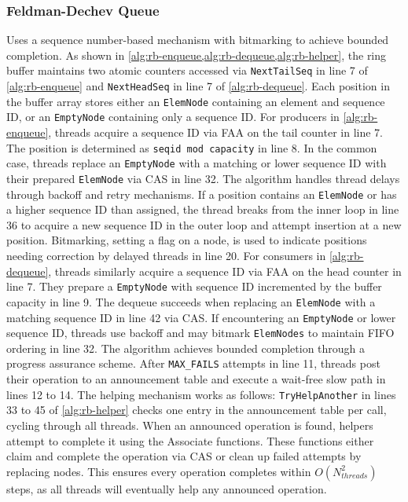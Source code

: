 \subsubsection{Feldman-Dechev Queue} 
Uses a sequence number-based mechanism with bitmarking to achieve bounded completion. As shown in \cref{alg:rb-enqueue,alg:rb-dequeue,alg:rb-helper}, the ring buffer maintains two atomic counters accessed via \texttt{NextTailSeq} in line 7 of \cref{alg:rb-enqueue} and \texttt{NextHeadSeq} in line 7 of \cref{alg:rb-dequeue}. Each position in the buffer array stores either an \texttt{ElemNode} containing an element and sequence ID, or an \texttt{EmptyNode} containing only a sequence ID. For producers in \cref{alg:rb-enqueue}, threads acquire a sequence ID via \ac{FAA} on the tail counter in line 7. The position is determined as \texttt{seqid mod capacity} in line 8. In the common case, threads replace an \texttt{EmptyNode} with a matching or lower sequence ID with their prepared \texttt{ElemNode} via \ac{CAS} in line 32. The algorithm handles thread delays through backoff and retry mechanisms. If a position contains an \texttt{ElemNode} or has a higher sequence ID than assigned, the thread breaks from the inner loop in line 36 to acquire a new sequence ID in the outer loop and attempt insertion at a new position. Bitmarking, setting a flag on a node, is used to indicate positions needing correction by delayed threads in line 20. For consumers in \cref{alg:rb-dequeue}, threads similarly acquire a sequence ID via \ac{FAA} on the head counter in line 7. They prepare a \texttt{EmptyNode} with sequence ID incremented by the buffer capacity in line 9. The dequeue succeeds when replacing an \texttt{ElemNode} with a matching sequence ID in line 42 via \ac{CAS}. If encountering an \texttt{EmptyNode} or lower sequence ID, threads use backoff and may bitmark \texttt{ElemNodes} to maintain FIFO ordering in line 32. The algorithm achieves bounded completion through a progress assurance scheme. After \texttt{MAX\_FAILS} attempts in line 11, threads post their operation to an announcement table and execute a wait-free slow path in lines 12 to 14. The helping mechanism works as follows: \texttt{TryHelpAnother} in lines 33 to 45 of \cref{alg:rb-helper} checks one entry in the announcement table per call, cycling through all threads. When an announced operation is found, helpers attempt to complete it using the Associate functions. These functions either claim and complete the operation via \ac{CAS} or clean up failed attempts by replacing nodes. This ensures every operation completes within $O(N_{threads}^2)$ steps, as all threads will eventually help any announced operation. \cite{FeldmanDechevV2}

